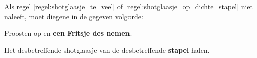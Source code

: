 \vervolgLijst{}
\item Als \eenSpeler regel \ref{regel:shotglaasje_te_veel} of \ref{regel:shotglaasje_op_dichte_stapel} niet naleeft, moet diegene in de gegeven volgorde:
\puntLijst{}
\item Proosten op  en \textbf{een Fritsje des nemen}\footnotemark[4].
\item Het desbetreffende shotglaasje van de desbetreffende \textbf{stapel} halen.
\eindPuntLijst{}
\eindLijst{}






